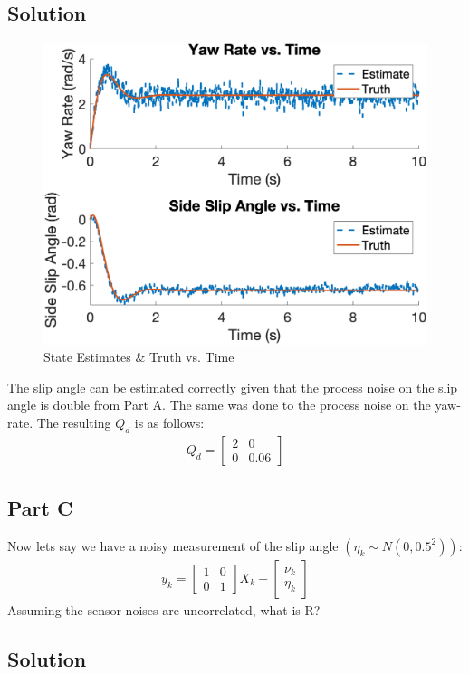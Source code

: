 \documentclass{article}
\begin{document}
\subsection*{Solution}
\begin{figure}[H]
    \centering
    \includegraphics[width=0.75\linewidth]{../figures/p4b_kf.png}
    \caption{State Estimates \& Truth vs. Time}\label{fig:p4b_kf}
\end{figure}
The slip angle can be estimated correctly given that the process noise on the slip angle is double from Part A.  The same was done to the process noise on the yaw-rate.  The resulting $Q_d$ is as follows:
\begin{gather*}
    Q_d = \begin{bmatrix}
        2 & 0\\
        0 & 0.06
    \end{bmatrix}
\end{gather*}

\subsection*{Part C}
Now lets say we have a noisy measurement of the slip angle $(\eta_k\sim N(0,0.5^2))$:
\begin{gather}
    y_k = \begin{bmatrix}
        1 & 0 \\
        0 & 1
    \end{bmatrix}X_k + \begin{bmatrix}
        \nu_k \\
        \eta_k
    \end{bmatrix}
\end{gather}
Assuming the sensor noises are uncorrelated, what is R?
\subsection*{Solution}
\end{document}
